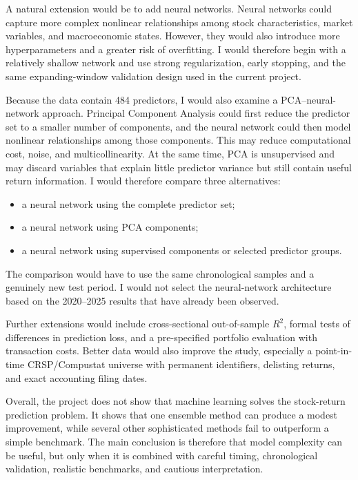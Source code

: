 \documentclass[11pt,a4paper]{article}
\begin{document}
A natural extension would be to add neural networks. Neural networks could
capture more complex nonlinear relationships among stock characteristics,
market variables, and macroeconomic states. However, they would also introduce
more hyperparameters and a greater risk of overfitting. I would therefore begin
with a relatively shallow network and use strong regularization, early
stopping, and the same expanding-window validation design used in the current
project.

Because the data contain 484 predictors, I would also examine a
PCA--neural-network approach. Principal Component Analysis could first reduce
the predictor set to a smaller number of components, and the neural network
could then model nonlinear relationships among those components. This may
reduce computational cost, noise, and multicollinearity. At the same time, PCA
is unsupervised and may discard variables that explain little predictor
variance but still contain useful return information. I would therefore compare
three alternatives:

\begin{itemize}
  \item a neural network using the complete predictor set;
  \item a neural network using PCA components;
  \item a neural network using supervised components or selected predictor
        groups.
\end{itemize}

The comparison would have to use the same chronological samples and a genuinely
new test period. I would not select the neural-network architecture based on the
2020--2025 results that have already been observed.

Further extensions would include cross-sectional out-of-sample \(R^2\), formal
tests of differences in prediction loss, and a pre-specified portfolio
evaluation with transaction costs. Better data would also improve the study,
especially a point-in-time CRSP/Compustat universe with permanent identifiers,
delisting returns, and exact accounting filing dates.

Overall, the project does not show that machine learning solves the stock-return
prediction problem. It shows that one ensemble method can produce a modest
improvement, while several other sophisticated methods fail to outperform a
simple benchmark. The main conclusion is therefore that model complexity can
be useful, but only when it is combined with careful timing, chronological
validation, realistic benchmarks, and cautious interpretation.

\FloatBarrier
\printbibliography[heading=bibintoc,title={References}]

\clearpage
\appendix
\end{document}
